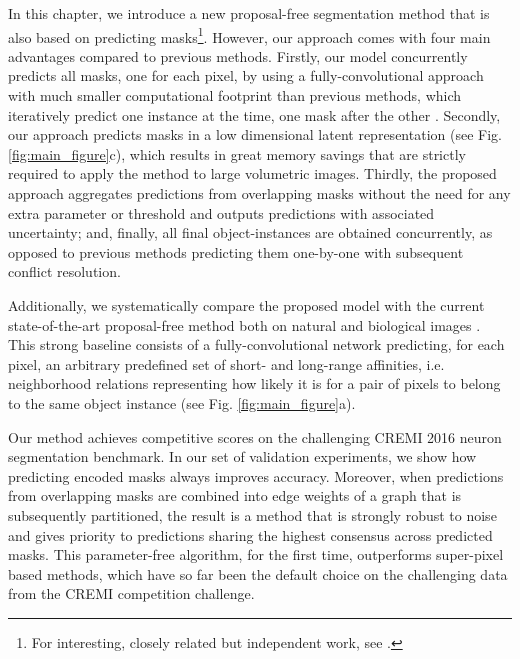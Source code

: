 In this chapter, we introduce a new proposal-free segmentation method that is also based on predicting \maskname masks\footnote{For interesting, closely related but independent work, see \cite{hirsch2020patchperpix}.}.
However, our approach comes with four main advantages compared to previous methods.
Firstly, our model concurrently predicts all \maskname masks, one for each pixel, by using a fully-convolutional approach with much smaller computational footprint than previous methods, which iteratively predict one instance at the time, one mask after the other \cite{januszewski2018high,meirovitch2016multi}.
Secondly, our approach predicts \maskname masks in a low dimensional latent representation (see Fig. \ref{fig:main_figure}c), which results in great memory savings that are strictly required to apply the method to large volumetric images. 
Thirdly, the proposed approach aggregates predictions from overlapping \maskname masks without the need for any extra parameter or threshold and outputs predictions with associated uncertainty;
and, finally, all final object-instances are obtained concurrently, as opposed to previous methods predicting them one-by-one with subsequent conflict resolution. 


Additionally, we systematically compare the proposed model with the current state-of-the-art proposal-free method both on natural and biological images \cite{liu2018affinity,Gao_2019_ICCV,lee2017superhuman,wolf2018mutex,bailoni2019generalized}. This strong baseline consists of a fully-convolutional network predicting, for each pixel, an arbitrary predefined set of short- and long-range affinities, i.e. neighborhood relations representing how likely it is for a pair of pixels to belong to the same object instance (see Fig. \ref{fig:main_figure}a). 

Our method achieves competitive scores on the challenging CREMI 2016 neuron segmentation benchmark. In our set of validation experiments, we show how predicting encoded \maskname masks always improves accuracy. Moreover, when predictions from overlapping masks are combined into edge weights of a graph that is subsequently partitioned, the result is a method that is strongly robust to noise and gives priority to predictions sharing the highest consensus across predicted masks. 
This parameter-free algorithm, for the first time, outperforms super-pixel based methods, which have so far been the default choice on the challenging data from the CREMI competition challenge.


